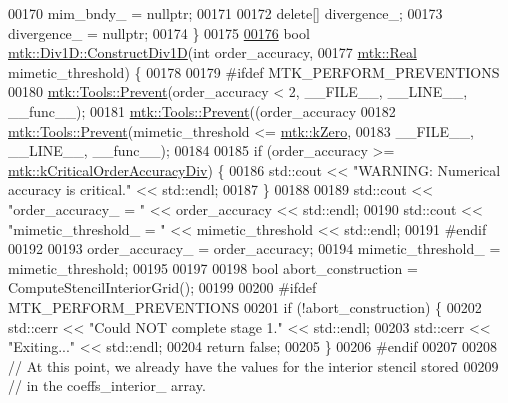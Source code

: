 \begin{DoxyCode}
00170   mim\_bndy\_ = \textcolor{keyword}{nullptr};
00171 
00172   \textcolor{keyword}{delete}[] divergence\_;
00173   divergence\_ = \textcolor{keyword}{nullptr};
00174 \}
00175 
\hypertarget{mtk__div__1d_8cc_source_l00176}{}\hyperlink{classmtk_1_1Div1D_a52fcd1542f11e606e36bd188e48bfdf7}{00176} \textcolor{keywordtype}{bool} \hyperlink{classmtk_1_1Div1D_a52fcd1542f11e606e36bd188e48bfdf7}{mtk::Div1D::ConstructDiv1D}(\textcolor{keywordtype}{int} order\_accuracy,
00177                                 \hyperlink{group__c01-roots_gac080bbbf5cbb5502c9f00405f894857d}{mtk::Real} mimetic\_threshold) \{
00178 
00179 \textcolor{preprocessor}{  #ifdef MTK\_PERFORM\_PREVENTIONS}
00180   \hyperlink{classmtk_1_1Tools_a332324c6f25e66be9dff48c5987a3b9f}{mtk::Tools::Prevent}(order\_accuracy < 2, \_\_FILE\_\_, \_\_LINE\_\_, \_\_func\_\_);
00181   \hyperlink{classmtk_1_1Tools_a332324c6f25e66be9dff48c5987a3b9f}{mtk::Tools::Prevent}((order\_accuracy%
00182   \hyperlink{classmtk_1_1Tools_a332324c6f25e66be9dff48c5987a3b9f}{mtk::Tools::Prevent}(mimetic\_threshold <= \hyperlink{group__c01-roots_ga59a451a5fae30d59649bcda274fea271}{mtk::kZero},
00183                       \_\_FILE\_\_, \_\_LINE\_\_, \_\_func\_\_);
00184 
00185   \textcolor{keywordflow}{if} (order\_accuracy >= \hyperlink{group__c01-roots_ga0898eef2108473e44a5223932d571c31}{mtk::kCriticalOrderAccuracyDiv}) \{
00186     std::cout << \textcolor{stringliteral}{"WARNING: Numerical accuracy is critical."} << std::endl;
00187   \}
00188 
00189   std::cout << \textcolor{stringliteral}{"order\_accuracy\_ = "} << order\_accuracy << std::endl;
00190   std::cout << \textcolor{stringliteral}{"mimetic\_threshold\_ = "} << mimetic\_threshold << std::endl;
00191 \textcolor{preprocessor}{  #endif}
00192 
00193   order\_accuracy\_ = order\_accuracy;
00194   mimetic\_threshold\_ = mimetic\_threshold;
00195 
00197 
00198   \textcolor{keywordtype}{bool} abort\_construction = ComputeStencilInteriorGrid();
00199 
00200 \textcolor{preprocessor}{  #ifdef MTK\_PERFORM\_PREVENTIONS}
00201   \textcolor{keywordflow}{if} (!abort\_construction) \{
00202     std::cerr << \textcolor{stringliteral}{"Could NOT complete stage 1."} << std::endl;
00203     std::cerr << \textcolor{stringliteral}{"Exiting..."} << std::endl;
00204     \textcolor{keywordflow}{return} \textcolor{keyword}{false};
00205   \}
00206 \textcolor{preprocessor}{  #endif}
00207 
00208   \textcolor{comment}{// At this point, we already have the values for the interior stencil stored}
00209   \textcolor{comment}{// in the coeffs\_interior\_ array.}

\end{DoxyCode}
